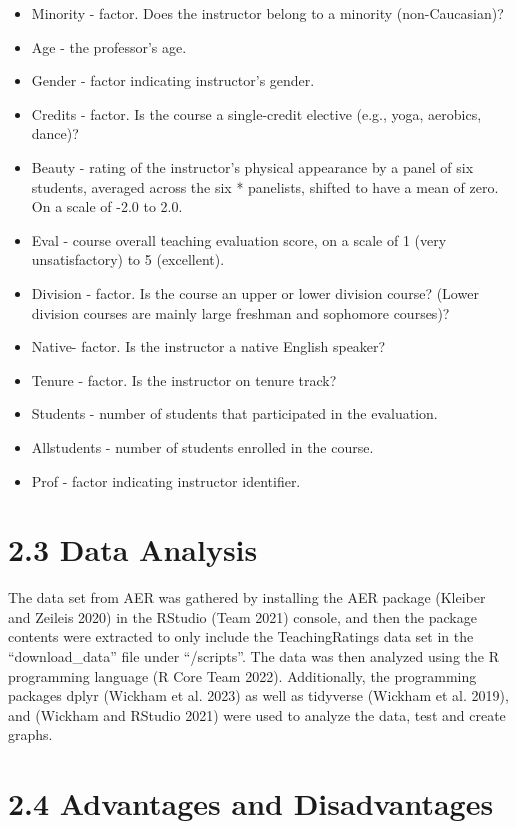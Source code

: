 \documentclass[
  letterpaper,
  DIV=11,
  numbers=noendperiod]{scrartcl}
\providecommand{\tightlist}{%
  \setlength{\itemsep}{0pt}\setlength{\parskip}{0pt}}\usepackage{longtable,booktabs,array}
\begin{document}
\begin{itemize}
\tightlist
\item
  Minority - factor. Does the instructor belong to a minority
  (non-Caucasian)?
\item
  Age - the professor's age.
\item
  Gender - factor indicating instructor's gender.
\item
  Credits - factor. Is the course a single-credit elective (e.g., yoga,
  aerobics, dance)?
\item
  Beauty - rating of the instructor's physical appearance by a panel of
  six students, averaged across the six * panelists, shifted to have a
  mean of zero. On a scale of -2.0 to 2.0.
\item
  Eval - course overall teaching evaluation score, on a scale of 1 (very
  unsatisfactory) to 5 (excellent).
\item
  Division - factor. Is the course an upper or lower division course?
  (Lower division courses are mainly large freshman and sophomore
  courses)?
\item
  Native- factor. Is the instructor a native English speaker?
\item
  Tenure - factor. Is the instructor on tenure track?
\item
  Students - number of students that participated in the evaluation.
\item
  Allstudents - number of students enrolled in the course.
\item
  Prof - factor indicating instructor identifier.
\end{itemize}

\hypertarget{data-analysis}{%
\section{2.3 Data Analysis}\label{data-analysis}}

The data set from AER was gathered by installing the AER package
(Kleiber and Zeileis 2020) in the RStudio (Team 2021) console, and then
the package contents were extracted to only include the TeachingRatings
data set in the ``download\_data'' file under ``/scripts''. The data was
then analyzed using the R programming language (R Core Team 2022).
Additionally, the programming packages dplyr (Wickham et al. 2023) as
well as tidyverse (Wickham et al. 2019), and (Wickham and RStudio 2021)
were used to analyze the data, test and create graphs.

\hypertarget{advantages-and-disadvantages}{%
\section{2.4 Advantages and
Disadvantages}\label{advantages-and-disadvantages}}
\end{document}

